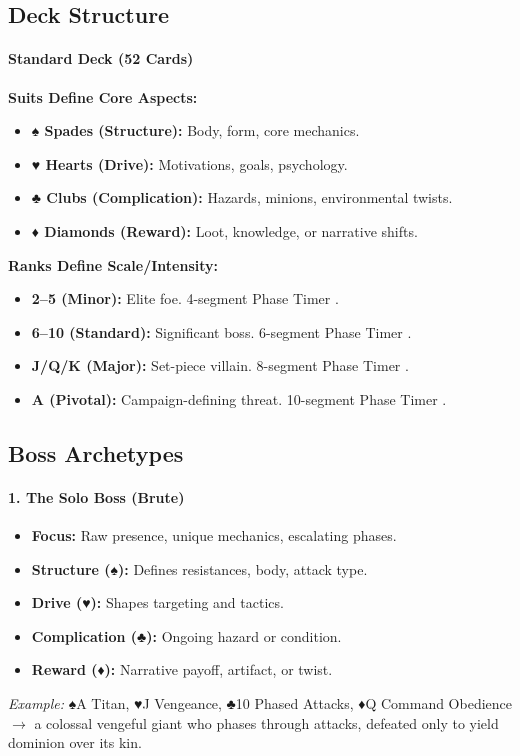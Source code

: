 \subsection{Deck Structure}
\paragraph{Standard Deck (52 Cards)}
\textbf{Suits Define Core Aspects:}
\begin{itemize}
    \item \textbf{♠ Spades (Structure):} Body, form, core mechanics.
    \item \textbf{♥ Hearts (Drive):} Motivations, goals, psychology.
    \item \textbf{♣ Clubs (Complication):} Hazards, minions, environmental twists.
    \item \textbf{♦ Diamonds (Reward):} Loot, knowledge, or narrative shifts.
\end{itemize}
\textbf{Ranks Define Scale/Intensity:}
\begin{itemize}
    \item \textbf{2--5 (Minor):} Elite foe. 4-segment Phase Timer .
    \item \textbf{6--10 (Standard):} Significant boss. 6-segment Phase Timer .
    \item \textbf{J/Q/K (Major):} Set-piece villain. 8-segment Phase Timer .
    \item \textbf{A (Pivotal):} Campaign-defining threat. 10-segment Phase Timer .
\end{itemize}

\subsection{Boss Archetypes}
\paragraph{1. The Solo Boss (Brute)}
\begin{itemize}
    \item \textbf{Focus:} Raw presence, unique mechanics, escalating phases.
    \item \textbf{Structure (♠):} Defines resistances, body, attack type.
    \item \textbf{Drive (♥):} Shapes targeting and tactics.
    \item \textbf{Complication (♣):} Ongoing hazard or condition.
    \item \textbf{Reward (♦):} Narrative payoff, artifact, or twist.
\end{itemize}
\emph{Example:} ♠A Titan, ♥J Vengeance, ♣10 Phased Attacks, ♦Q Command Obedience $\rightarrow$ a colossal vengeful giant who phases through attacks, defeated only to yield dominion over its kin.

